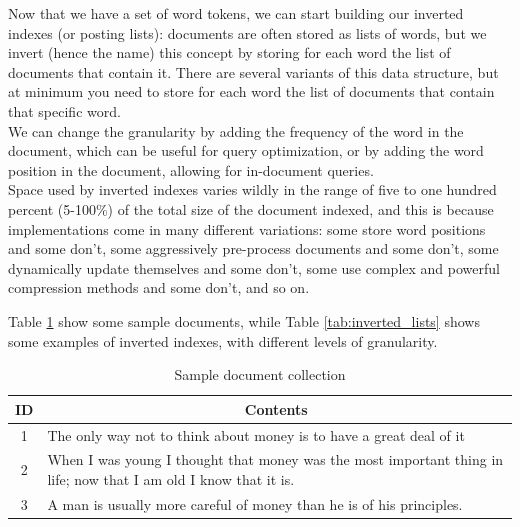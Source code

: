 Now that we have a set of word tokens, we can start building our inverted indexes (or posting lists): documents are often stored as lists of words, but we invert (hence the name) this concept by storing for each word the list of documents that contain it. There are several variants of this data structure, but at minimum you need to store for each word the list of documents that contain that specific word. \\
We can change the granularity by adding the frequency of the word in the document, which can be useful for query optimization, or by adding the word position in the document, allowing for in-document queries.\\
Space used by inverted indexes varies wildly in the range of five to one hundred percent (5-100\%) of the total size of the document indexed, and this is because implementations come in many different variations: some store word positions and some don't, some aggressively pre-process documents and some don't, some dynamically update themselves and some don't, some use complex and powerful compression methods and some don't, and so on. 

Table \ref{tab:sample_docs} show some sample documents, while Table \ref{tab:inverted_lists} shows some examples of inverted indexes, with different levels of granularity.

\begin{table}[ht]
    \begin{center}
        \begin{tabularx}{\textwidth}{|c|X|}
            \hline
            \textbf{ID} & \multicolumn{1}{c|}{\textbf{Contents}}  \\ \hline
            1 & The only way not to think about money is to have a great deal of it \\ \hline
            2 & When I was young I thought that money was the most important thing in life; now that I am old I know that it is. \\ \hline
            3 & A man is usually more careful of money than he is of his principles.\\ \hline
        \end{tabularx}
        \caption{Sample document collection\label{tab:sample_docs}}
    \end{center}
\end{table}

